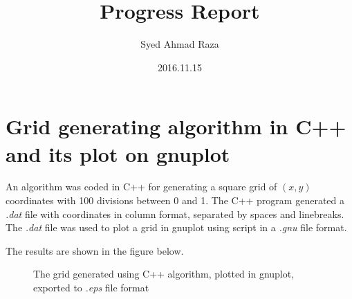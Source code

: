 \documentclass[12pt,a4paper,fleqn]{article}
\title{Progress Report}
\author{Syed Ahmad Raza}
\date{2016.11.15}
\begin{document}
	\maketitle
		\section*{Grid generating algorithm in C++ and its plot on gnuplot}
		An algorithm was coded in C++ for generating a square grid of $(x, y)$ coordinates with 100 divisions between 0 and 1. The C++ program generated  a \emph{.dat} file with coordinates in column format, separated by spaces and linebreaks. The \emph{.dat} file was used to plot a grid in gnuplot using script in a \emph{.gnu} file format.
		
		The results are shown in the figure below.
	\begin{figure}
		
		\caption{The grid generated using C++ algorithm, plotted in gnuplot, exported to \emph{.eps} file format}
	\end{figure}
\end{document}

